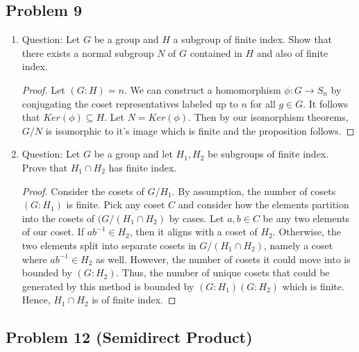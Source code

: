 \documentclass[Lang.tex]{subfiles}
\begin{document}
\subsection*{Problem 9}

\begin{enumerate}
\item 
Question: Let $G$ be a group and $H$ a subgroup of finite index. Show that there exists a normal subgroup $N$ of $G$ contained in $H$ and also of finite index.

\begin{proof}
Let $(G : H) = n$. We can construct a homomorphism $\phi: G \rightarrow S_n$ by conjugating the coset representatives labeled up to $n$ for all $g \in G$. It follows that $Ker(\phi) \subseteq H$. Let $N = Ker(\phi)$. Then by our isomorphism theorems, $G/N$ is isomorphic to it's image which is finite and the proposition follows.   
\end{proof}

\item
Question: Let $G$ be a group and let $H_1,H_2$ be subgroups of finite index. Prove that $H_1 \cap H_2$ has finite index.

\begin{proof}
Consider the cosets of $G/H_1$. By assumption, the number of cosets $(G:H_1)$ is finite. Pick any coset $C$ and consider how the elements partition into the cosets of $(G/(H_1 \cap H_2)$ by cases. Let $a,b \in C$ be any two elements of our coset. If $ab^{-1} \in H_2$, then it aligns with a coset of $H_2$. Otherwise, the two elements split into separate cosets in $G/(H_1 \cap H_2)$, namely a coset where $ab^{-1} \in H_2$ as well. However, the number of cosets it could move into is bounded by $(G:H_2)$. Thus, the number of unique cosets that could be generated by this method is bounded by $(G:H_1)(G:H_2)$ which is finite. Hence, $H_1 \cap H_2$ is of finite index. \end{proof}
\end{enumerate}

\subsection{Problem 12 (Semidirect Product)}
\end{document}
